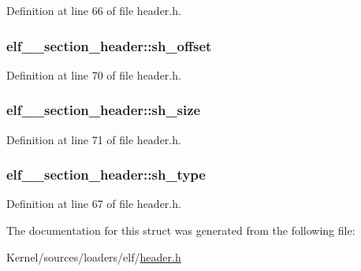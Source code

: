 Definition at line 66 of file header.h.

\hypertarget{structelf__32__section__header_a5f1a922a39c88958afb39326f293389c}{
\subsubsection[{sh\_\-offset}]{ {\bf elf\_\_\-section\_\-header::sh\_\-offset}}}
\label{structelf__32__section__header_a5f1a922a39c88958afb39326f293389c}


Definition at line 70 of file header.h.

\hypertarget{structelf__32__section__header_ae0bb6c0f10c7b5e9242b89f8f02a5acb}{
\subsubsection[{sh\_\-size}]{ {\bf elf\_\_\-section\_\-header::sh\_\-size}}}
\label{structelf__32__section__header_ae0bb6c0f10c7b5e9242b89f8f02a5acb}


Definition at line 71 of file header.h.

\hypertarget{structelf__32__section__header_aa19ec0f26eb1c4e79de6f1b7e7362d7c}{
\subsubsection[{sh\_\-type}]{ {\bf elf\_\_\-section\_\-header::sh\_\-type}}}
\label{structelf__32__section__header_aa19ec0f26eb1c4e79de6f1b7e7362d7c}


Definition at line 67 of file header.h.



The documentation for this struct was generated from the following file:\begin{DoxyCompactItemize}
\item 
Kernel/sources/loaders/elf/\hyperlink{header_8h}{header.h}\end{DoxyCompactItemize}
